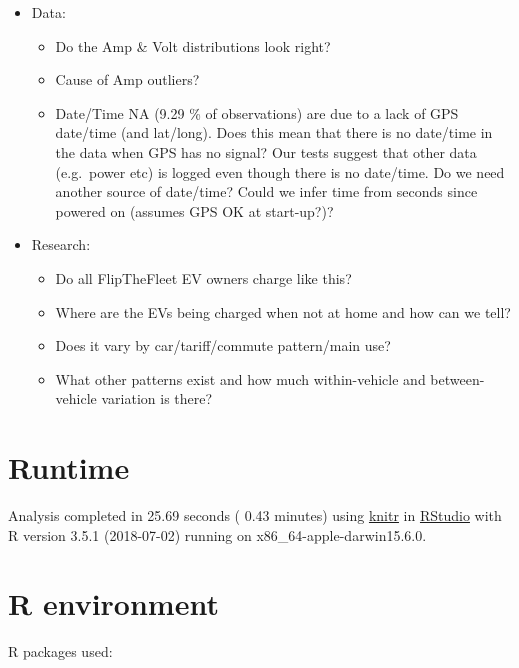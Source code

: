 \documentclass[]{article}
\providecommand{\tightlist}{%
  \setlength{\itemsep}{0pt}\setlength{\parskip}{0pt}}
\begin{document}
\begin{itemize}
\tightlist
\item
  Data:

  \begin{itemize}
  \tightlist
  \item
    Do the Amp \& Volt distributions look right?
  \item
    Cause of Amp outliers?
  \item
    Date/Time NA (9.29 \% of observations) are due to a lack of GPS
    date/time (and lat/long). Does this mean that there is no date/time
    in the data when GPS has no signal? Our tests suggest that other
    data (e.g.~power etc) is logged even though there is no date/time.
    Do we need another source of date/time? Could we infer time from
    seconds since powered on (assumes GPS OK at start-up?)?
  \end{itemize}
\item
  Research:

  \begin{itemize}
  \tightlist
  \item
    Do all FlipTheFleet EV owners charge like this?
  \item
    Where are the EVs being charged when not at home and how can we
    tell?
  \item
    Does it vary by car/tariff/commute pattern/main use?
  \item
    What other patterns exist and how much within-vehicle and
    between-vehicle variation is there?
  \end{itemize}
\end{itemize}

\section{Runtime}\label{runtime}

Analysis completed in 25.69 seconds ( 0.43 minutes) using
\href{https://cran.r-project.org/package=knitr}{knitr} in
\href{http://www.rstudio.com}{RStudio} with R version 3.5.1 (2018-07-02)
running on x86\_64-apple-darwin15.6.0.

\section{R environment}\label{r-environment}

R packages used:
\end{document}
